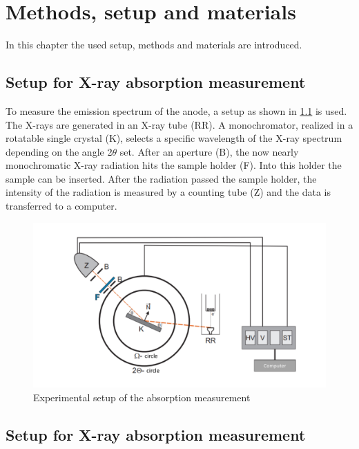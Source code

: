

\chapter{Methods, setup and materials}
\label{chap:methods}

In this chapter the used setup, methods and materials are introduced.

\section[Absorption measurement]{Setup for X-ray absorption measurement}

To measure the emission spectrum of the anode, a setup as shown in \cref{fig:setupabs} is used. The X-rays are generated in an X-ray tube (RR). A monochromator, realized in a rotatable single crystal (K), 
selects a specific wavelength of the X-ray spectrum depending on the angle 2$\theta$ set. After an aperture (B), the now nearly monochromatic X-ray radiation hits the sample holder (F). Into this holder the sample
can be inserted. After the radiation passed the sample holder, the intensity of the radiation is measured by a counting tube (Z) and the data is transferred to a computer.

\begin{figure}[h]
    \centering
    \includegraphics[width =\textwidth]{Bilder/Setup/SetupAbsorb.pdf}
    \caption{Experimental setup of the absorption measurement}
    \label{fig:setupabs}
\end{figure}


\section[Diffraction measurement]{Setup for X-ray absorption measurement}

